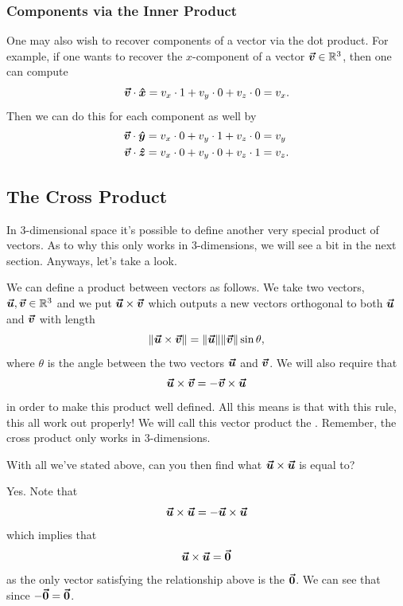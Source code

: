         \subsubsection{Components via the Inner Product}
            One may also wish to recover components of a vector via the dot product.  For example, if one wants to recover the $x$-component of a vector $\boldsymbol{\boldsymbol{\vec{v}}} \in \mathbb{R}^3$, then one can compute
            \[
            \boldsymbol{\boldsymbol{\vec{v}}} \cdot \boldsymbol{\hat{x}} = v_x \cdot 1 + v_y \cdot 0 + v_z \cdot 0 = v_x.
            \]
            Then we can do this for each component as well by
            \begin{align*}
                \boldsymbol{\boldsymbol{\vec{v}}} \cdot \boldsymbol{\hat{y}} &= v_x \cdot 0 + v_y \cdot 1 + v_z \cdot 0 = v_y\\
                \boldsymbol{\boldsymbol{\vec{v}}} \cdot \boldsymbol{\hat{z}} &= v_x \cdot 0 + v_y \cdot 0 + v_z \cdot 1 = v_z.
            \end{align*}
            
        
        
    \subsection{The Cross Product}
        In 3-dimensional space it's possible to define another very special product of vectors.  As to why this only works in 3-dimensions, we will see a bit in the next section.  Anyways, let's take a look.
        
        We can define a product between vectors as follows. We take two vectors, $\boldsymbol{\boldsymbol{\vec{u}}},\boldsymbol{\boldsymbol{\vec{v}}} \in \mathbb{R}^3$ and we put $\boldsymbol{\boldsymbol{\vec{u}}}\times \boldsymbol{\boldsymbol{\vec{v}}}$ which outputs a new vectors orthogonal to both $\boldsymbol{\boldsymbol{\vec{u}}}$ and $\boldsymbol{\boldsymbol{\vec{v}}}$ with length
        \[
        \|\boldsymbol{\boldsymbol{\vec{u}}}\times \boldsymbol{\boldsymbol{\vec{v}}}\|=\|\boldsymbol{\boldsymbol{\vec{u}}}\|\|\boldsymbol{\boldsymbol{\vec{v}}}\|\sin \theta,
        \]
        where $\theta$ is the angle between the two vectors $\boldsymbol{\boldsymbol{\vec{u}}}$ and $\boldsymbol{\boldsymbol{\vec{v}}}$. We will also require that
        \[
        \boldsymbol{\boldsymbol{\vec{u}}} \times \boldsymbol{\boldsymbol{\vec{v}}}=-\boldsymbol{\boldsymbol{\vec{v}}} \times \boldsymbol{\boldsymbol{\vec{u}}}
        \]
        in order to make this product well defined.  All this means is that with this rule, this all work out properly! We will call this vector product the . Remember, the cross product only works in 3-dimensions.
        
        \begin{question}
        With all we've stated above, can you then find what $\boldsymbol{\boldsymbol{\vec{u}}}\times \boldsymbol{\boldsymbol{\vec{u}}}$ is equal to?
        \end{question}
        
        \begin{question}
        Yes.  Note that
        \[
        \boldsymbol{\boldsymbol{\vec{u}}}\times \boldsymbol{\boldsymbol{\vec{u}}}=-\boldsymbol{\boldsymbol{\vec{u}}}\times \boldsymbol{\boldsymbol{\vec{u}}}
        \]
        which implies that
        \[
        \boldsymbol{\boldsymbol{\vec{u}}}\times \boldsymbol{\boldsymbol{\vec{u}}}=\boldsymbol{\vec{0}}
        \]
        as the only vector satisfying the relationship above is the $\boldsymbol{\vec{0}}$. We can see that since $-\boldsymbol{\vec{0}}=\boldsymbol{\vec{0}}$.
        \end{question}
        
